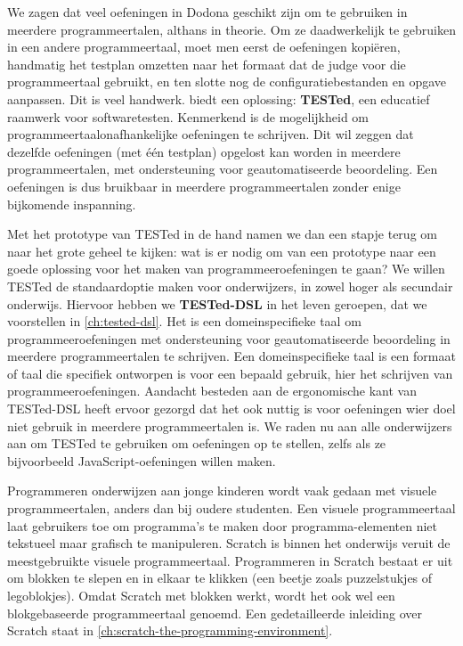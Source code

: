 \documentclass[main]{subfiles}
\begin{document}
We zagen dat veel oefeningen in Dodona geschikt zijn om te gebruiken in meerdere programmeertalen, althans in theorie.
Om ze daadwerkelijk te gebruiken in een andere programmeertaal, moet men eerst de oefeningen kopiëren, handmatig het testplan omzetten naar het formaat dat de judge voor die programmeertaal gebruikt, en ten slotte nog de configuratiebestanden en opgave aanpassen.
Dit is veel handwerk.
 biedt een oplossing: \textbf{TESTed}, een educatief raamwerk voor softwaretesten.
Kenmerkend is de mogelijkheid om programmeertaalonafhankelijke oefeningen te schrijven.
Dit wil zeggen dat dezelfde oefeningen (met één testplan) opgelost kan worden in meerdere programmeertalen, met ondersteuning voor geautomatiseerde beoordeling.
Een oefeningen is dus bruikbaar in meerdere programmeertalen zonder enige bijkomende inspanning.

Met het prototype van TESTed in de hand namen we dan een stapje terug om naar het grote geheel te kijken: wat is er nodig om van een prototype naar een goede oplossing voor het maken van programmeeroefeningen te gaan?
We willen TESTed de standaardoptie maken voor onderwijzers, in zowel hoger als secundair onderwijs.
Hiervoor hebben we \textbf{TESTed-DSL} in het leven geroepen, dat we voorstellen in \cref{ch:tested-dsl}.
Het is een domeinspecifieke taal om programmeeroefeningen met ondersteuning voor geautomatiseerde beoordeling in meerdere programmeertalen te schrijven.
Een domeinspecifieke taal is een formaat of taal die specifiek ontworpen is voor een bepaald gebruik, hier het schrijven van programmeeroefeningen.
Aandacht besteden aan de ergonomische kant van TESTed-DSL heeft ervoor gezorgd dat het ook nuttig is voor oefeningen wier doel niet gebruik in meerdere programmeertalen is.
We raden nu aan alle onderwijzers aan om TESTed te gebruiken om oefeningen op te stellen, zelfs als ze bijvoorbeeld JavaScript-oefeningen willen maken.

Programmeren onderwijzen aan jonge kinderen wordt vaak gedaan met visuele programmeertalen, anders dan bij oudere studenten.
Een visuele programmeertaal laat gebruikers toe om programma's te maken door programma-elementen niet tekstueel maar grafisch te manipuleren.
Scratch is binnen het onderwijs veruit de meestgebruikte visuele programmeertaal.
Programmeren in Scratch bestaat er uit om blokken te slepen en in elkaar te klikken (een beetje zoals puzzelstukjes of legoblokjes).
Omdat Scratch met blokken werkt, wordt het ook wel een blokgebaseerde programmeertaal genoemd.
Een gedetailleerde inleiding over Scratch staat in \cref{ch:scratch-the-programming-environment}.
\end{document}
